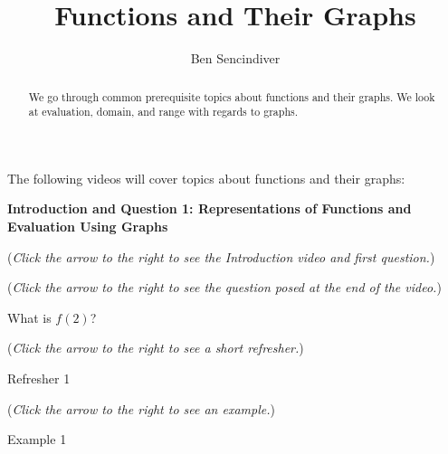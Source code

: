 \documentclass{ximera}
\title[Prerequisite Videos: ]{Functions and Their Graphs}
\author{Ben Sencindiver}
\begin{document}
\begin{abstract}
  We go through common prerequisite topics about functions and their graphs. 
  We look at evaluation, domain, and range with regards to graphs.
\end{abstract}
\maketitle

The following videos will cover topics about functions and their graphs:

\textbf{Introduction and Question 1: Representations of Functions and Evaluation Using Graphs}
\begin{question}
\begin{flushright}
{\color{blue}(\emph{Click the arrow to the right to see the Introduction video and first question.})}
\end{flushright}
\begin{center}
\begin{expandable}
{\color{blue}(\emph{Click the arrow to the right to see the  question
posed at the end of the video.})}
\begin{expandable}
What is $f(2)$?
\begin{multipleChoice}
\end{multipleChoice}
\begin{flushright}
{\color{blue}(\emph{Click the arrow to the right to see a short refresher.})}
\end{flushright}
\begin{expandable}
Refresher 1
\end{expandable}
\begin{flushright}
{\color{blue}(\emph{Click the arrow to the right to see an example.})}
\end{flushright}
\begin{expandable}
Example 1
\end{expandable}
\end{expandable}
\end{expandable}
\end{center}
\end{question}
\end{document}
